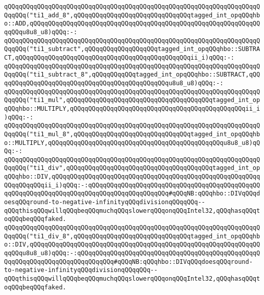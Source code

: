 \verb|qQQqqQQqqQQqqQQqqQQqqQQqqQQqqQQqqQQqqQQqqQQqqQQqqQQqqQQqqQQqqQQqqQQqqQQqqQQq("ti1_add_8",qQQqqQQqqQQqqQQqqQQqqQQqqQQqqQQqtagged_int_opqQQqhbo::ADD,qQQqqQQqqQQqqQQqqQQqqQQqqQQqqQQqqQQqqQQqqQQqqQQqqQQqqQQqqQQqqQQqqQQqu8u8_u8)qQQq:-:|\newline
\newline
\verb|qQQqqQQqqQQqqQQqqQQqqQQqqQQqqQQqqQQqqQQqqQQqqQQqqQQqqQQqqQQqqQQqqQQqqQQqqQQq("ti1_subtract",qQQqqQQqqQQqqQQqqQQqtagged_int_opqQQqhbo::SUBTRACT,qQQqqQQqqQQqqQQqqQQqqQQqqQQqqQQqqQQqqQQqqQQqqQQqii_i)qQQq:-:|\newline
\verb|qQQqqQQqqQQqqQQqqQQqqQQqqQQqqQQqqQQqqQQqqQQqqQQqqQQqqQQqqQQqqQQqqQQqqQQqqQQq("ti1_subtract_8",qQQqqQQqqQQqtagged_int_opqQQqhbo::SUBTRACT,qQQqqQQqqQQqqQQqqQQqqQQqqQQqqQQqqQQqqQQqqQQqqQQqu8u8_u8)qQQq:-:|\newline
\newline
\verb|qQQqqQQqqQQqqQQqqQQqqQQqqQQqqQQqqQQqqQQqqQQqqQQqqQQqqQQqqQQqqQQqqQQqqQQqqQQq("ti1_mul",qQQqqQQqqQQqqQQqqQQqqQQqqQQqqQQqqQQqqQQqtagged_int_opqQQqhbo::MULTIPLY,qQQqqQQqqQQqqQQqqQQqqQQqqQQqqQQqqQQqqQQqqQQqqQQqii_i)qQQq:-:|\newline
\verb|qQQqqQQqqQQqqQQqqQQqqQQqqQQqqQQqqQQqqQQqqQQqqQQqqQQqqQQqqQQqqQQqqQQqqQQqqQQq("ti1_mul_8",qQQqqQQqqQQqqQQqqQQqqQQqqQQqqQQqtagged_int_opqQQqhbo::MULTIPLY,qQQqqQQqqQQqqQQqqQQqqQQqqQQqqQQqqQQqqQQqqQQqqQQqu8u8_u8)qQQq:-:|\newline
\newline
\verb|qQQqqQQqqQQqqQQqqQQqqQQqqQQqqQQqqQQqqQQqqQQqqQQqqQQqqQQqqQQqqQQqqQQqqQQqqQQq("ti1_div",qQQqqQQqqQQqqQQqqQQqqQQqqQQqqQQqqQQqqQQqtagged_int_opqQQqhbo::DIV,qQQqqQQqqQQqqQQqqQQqqQQqqQQqqQQqqQQqqQQqqQQqqQQqqQQqqQQqqQQqqQQqqQQqii_i)qQQq:-:qQQqqQQqqQQqqQQqqQQqqQQqqQQqqQQqqQQqqQQqqQQqqQQqqQQqqQQqqQQqqQQqqQQqqQQqqQQqqQQqqQQqqQQqqQQq#qQQqNB:qQQqhbo::DIVqQQqdoesqQQqround-to-negative-infinityqQQqdivisionqQQqqQQq--qQQqthisqQQqwillqQQqbeqQQqmuchqQQqslowerqQQqonqQQqIntel32,qQQqhasqQQqtoqQQqbeqQQqfaked.|\newline
\verb|qQQqqQQqqQQqqQQqqQQqqQQqqQQqqQQqqQQqqQQqqQQqqQQqqQQqqQQqqQQqqQQqqQQqqQQqqQQq("ti1_div_8",qQQqqQQqqQQqqQQqqQQqqQQqqQQqqQQqtagged_int_opqQQqhbo::DIV,qQQqqQQqqQQqqQQqqQQqqQQqqQQqqQQqqQQqqQQqqQQqqQQqqQQqqQQqqQQqqQQqqQQqu8u8_u8)qQQq:-:qQQqqQQqqQQqqQQqqQQqqQQqqQQqqQQqqQQqqQQqqQQqqQQqqQQqqQQqqQQqqQQqqQQqqQQqqQQqqQQq#qQQqNB:qQQqhbo::DIVqQQqdoesqQQqround-to-negative-infinityqQQqdivisionqQQqqQQq--qQQqthisqQQqwillqQQqbeqQQqmuchqQQqslowerqQQqonqQQqIntel32,qQQqhasqQQqtoqQQqbeqQQqfaked.|\newline
\newline
